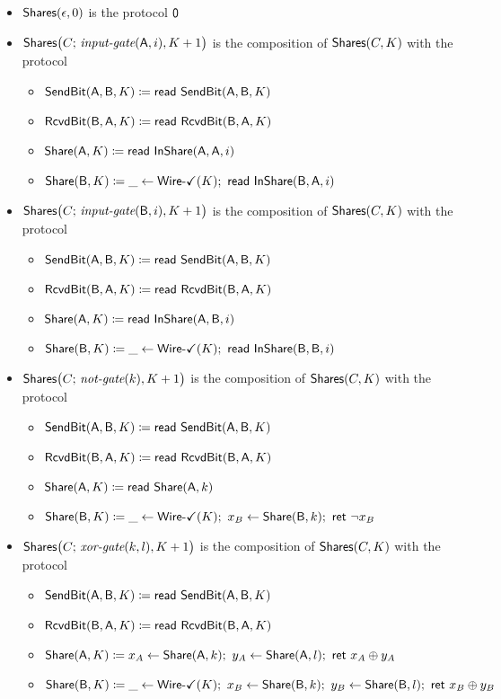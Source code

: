 \begin{itemize}
\item $\Shares(\epsilon,0)$ is the protocol $\zero$

\item $\Shares\big(C; \, \inputgate(\A,i),K+1\big)$ is the composition of $\Shares(C,K)$ with the protocol
\begin{itemize}
\item $\SendBit(\A,\B,K) \coloneqq \read{\SendBit(\A,\B,K)}$
\item $\RcvdBit(\B,\A,K) \coloneqq \read{\RcvdBit(\B,\A,K)}$
\item $\Share(\A,K) \coloneqq \read{\InShare(\A,\A,i)}$
\item $\Share(\B,K) \coloneqq \_ \leftarrow \WireOk(K); \ \read{\InShare(\B,\A,i)}$
\end{itemize}

\item $\Shares\big(C; \, \inputgate(\B,i),K+1\big)$ is the composition of $\Shares(C,K)$ with the protocol
\begin{itemize}
\item $\SendBit(\A,\B,K) \coloneqq \read{\SendBit(\A,\B,K)}$
\item $\RcvdBit(\B,\A,K) \coloneqq \read{\RcvdBit(\B,\A,K)}$
\item $\Share(\A,K) \coloneqq \read{\InShare(\A,\B,i)}$
\item $\Share(\B,K) \coloneqq \_ \leftarrow \WireOk(K); \ \read{\InShare(\B,\B,i)}$
\end{itemize}

\item $\Shares\big(C; \, \notgate(k),K+1\big)$ is the composition of $\Shares(C,K)$ with the protocol
\begin{itemize}
\item $\SendBit(\A,\B,K) \coloneqq \read{\SendBit(\A,\B,K)}$
\item $\RcvdBit(\B,\A,K) \coloneqq \read{\RcvdBit(\B,\A,K)}$
\item $\Share(\A,K) \coloneqq \read{\Share(\A,k)}$
\item $\Share(\B,K) \coloneqq \_ \leftarrow \WireOk(K); \ x_B \leftarrow \Share(\B,k); \ \ret{\neg x_B}$
\end{itemize}

\item $\Shares\big(C; \, \xorgate(k,l),K+1\big)$ is the composition of $\Shares(C,K)$ with the protocol
\begin{itemize}
\item $\SendBit(\A,\B,K) \coloneqq \read{\SendBit(\A,\B,K)}$
\item $\RcvdBit(\B,\A,K) \coloneqq \read{\RcvdBit(\B,\A,K)}$
\item $\Share(\A,K) \coloneqq x_A \leftarrow \Share(\A,k); \ y_A \leftarrow \Share(\A,l); \ \ret{x_A \oplus y_A}$
\item $\Share(\B,K) \coloneqq \_ \leftarrow \WireOk(K); \ x_B \leftarrow \Share(\B,k); \ y_B \leftarrow \Share(\B,l); \ \ret{x_B \oplus y_B}$
\end{itemize}


\end{itemize}
